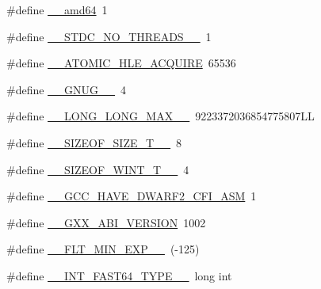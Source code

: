 \begin{DoxyCompactItemize}
\item 
\#define \hyperlink{build-analizer__host-_desktop___qt__5__9__0___g_c_c__64bit-debug_2moc__predefs_8h_ac78e83c300ae463c501bbe70c5a2a8c7}{\+\_\+\+\_\+amd64}~1
\item 
\#define \hyperlink{build-analizer__host-_desktop___qt__5__9__0___g_c_c__64bit-debug_2moc__predefs_8h_a80dc30fae2c51e5db5b4f5eb7400cd1a}{\+\_\+\+\_\+\+S\+T\+D\+C\+\_\+\+N\+O\+\_\+\+T\+H\+R\+E\+A\+D\+S\+\_\+\+\_\+}~1
\item 
\#define \hyperlink{build-analizer__host-_desktop___qt__5__9__0___g_c_c__64bit-debug_2moc__predefs_8h_ac227f24525ec0825a758b2eb0869dc8f}{\+\_\+\+\_\+\+A\+T\+O\+M\+I\+C\+\_\+\+H\+L\+E\+\_\+\+A\+C\+Q\+U\+I\+R\+E}~65536
\item 
\#define \hyperlink{build-analizer__host-_desktop___qt__5__9__0___g_c_c__64bit-debug_2moc__predefs_8h_ae7afb460abc6122c6a5f206d78bcae4e}{\+\_\+\+\_\+\+G\+N\+U\+G\+\_\+\+\_\+}~4
\item 
\#define \hyperlink{build-analizer__host-_desktop___qt__5__9__0___g_c_c__64bit-debug_2moc__predefs_8h_a9bed0d0b1893211f857ad76d6728ea7e}{\+\_\+\+\_\+\+L\+O\+N\+G\+\_\+\+L\+O\+N\+G\+\_\+\+M\+A\+X\+\_\+\+\_\+}~9223372036854775807\+L\+L
\item 
\#define \hyperlink{build-analizer__host-_desktop___qt__5__9__0___g_c_c__64bit-debug_2moc__predefs_8h_ab6eb3d66486ef05ac7f1d489bfc675b4}{\+\_\+\+\_\+\+S\+I\+Z\+E\+O\+F\+\_\+\+S\+I\+Z\+E\+\_\+\+T\+\_\+\+\_\+}~8
\item 
\#define \hyperlink{build-analizer__host-_desktop___qt__5__9__0___g_c_c__64bit-debug_2moc__predefs_8h_a808f04c28bb0ef2d6b77dd66564ad351}{\+\_\+\+\_\+\+S\+I\+Z\+E\+O\+F\+\_\+\+W\+I\+N\+T\+\_\+\+T\+\_\+\+\_\+}~4
\item 
\#define \hyperlink{build-analizer__host-_desktop___qt__5__9__0___g_c_c__64bit-debug_2moc__predefs_8h_a89cfc45cff96747b74ae03bdb2310814}{\+\_\+\+\_\+\+G\+C\+C\+\_\+\+H\+A\+V\+E\+\_\+\+D\+W\+A\+R\+F2\+\_\+\+C\+F\+I\+\_\+\+A\+S\+M}~1
\item 
\#define \hyperlink{build-analizer__host-_desktop___qt__5__9__0___g_c_c__64bit-debug_2moc__predefs_8h_aee5d0901405056d87e3bd47fee83128d}{\+\_\+\+\_\+\+G\+X\+X\+\_\+\+A\+B\+I\+\_\+\+V\+E\+R\+S\+I\+O\+N}~1002
\item 
\#define \hyperlink{build-analizer__host-_desktop___qt__5__9__0___g_c_c__64bit-debug_2moc__predefs_8h_acd7b9de9b6bd817027cb37ec6c82cba9}{\+\_\+\+\_\+\+F\+L\+T\+\_\+\+M\+I\+N\+\_\+\+E\+X\+P\+\_\+\+\_\+}~(-\/125)
\item 
\#define \hyperlink{build-analizer__host-_desktop___qt__5__9__0___g_c_c__64bit-debug_2moc__predefs_8h_a65967d857259eb36c9546a512f2ab4b5}{\+\_\+\+\_\+\+I\+N\+T\+\_\+\+F\+A\+S\+T64\+\_\+\+T\+Y\+P\+E\+\_\+\+\_\+}~long int

\end{DoxyCompactItemize}
